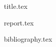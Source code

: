 \documentclass[a4paper,11pt]{article}
\theoremstyle{definition}
\begin{document}

{title.tex}


\clearpage 
\tableofcontents
\clearpage

{report.tex}


\clearpage 
{} 
 
{bibliography.tex}
\clearpage 
\printindex 
\end{document}
